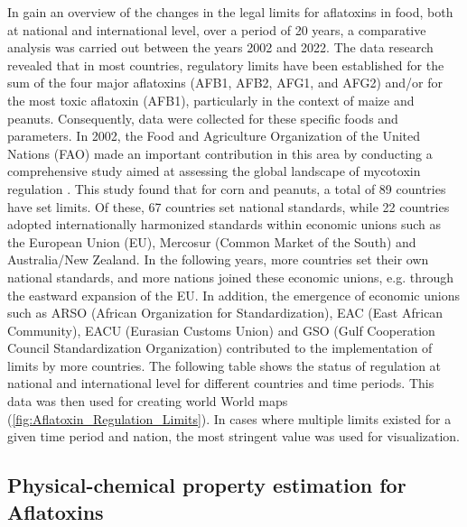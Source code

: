 In gain an overview of the changes in the legal limits for aflatoxins in food, both at national and international level, over a period of 20 years, a comparative analysis was carried out between the years 2002 and 2022. The data research revealed that in most countries, regulatory limits have been established for the sum of the four major aflatoxins (AFB1, AFB2, AFG1, and AFG2) and/or for the most toxic aflatoxin (AFB1), particularly in the context of maize and peanuts. Consequently, data were collected for these specific foods and parameters. In 2002, the Food and Agriculture Organization of the United Nations (FAO) made an important contribution in this area by conducting a comprehensive study aimed at assessing the global landscape of mycotoxin regulation \citep{van2004worldwide}. This study found that for corn and peanuts, a total of 89 countries have set limits. Of these, 67 countries set national standards, while 22 countries adopted internationally harmonized standards within economic unions such as the European Union (EU), Mercosur (Common Market of the South) and Australia/New Zealand. In the following years, more countries set their own national standards, and more nations joined these economic unions, e.g. through the eastward expansion of the EU. In addition, the emergence of economic unions such as ARSO (African Organization for Standardization), EAC (East African Community), EACU (Eurasian Customs Union) and GSO (Gulf Cooperation Council Standardization Organization) contributed to the implementation of limits by more countries. The following table shows the status of regulation at national and international level for different countries and time periods. This data was then used for creating world  World maps (\ref{fig:Aflatoxin_Regulation_Limits}). In cases where multiple limits existed for a given time period and nation, the most stringent value was used for visualization.

\clearpage



\clearpage

\subsection*{Physical-chemical property estimation for Aflatoxins} 
\label{Annex:estimation}

